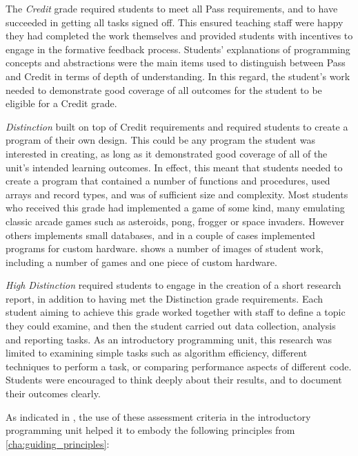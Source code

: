 The \emph{Credit} grade required students to meet all Pass requirements, and to have succeeded in getting all tasks signed off. This ensured teaching staff were happy they had completed the work themselves and provided students with incentives to engage in the formative feedback process. Students' explanations of programming concepts and abstractions were the main items used to distinguish between Pass and Credit in terms of depth of understanding. In this regard, the student's work needed to demonstrate good coverage of all outcomes for the student to be eligible for a Credit grade.

\emph{Distinction} built on top of Credit requirements and required students to create a program of their own design. This could be any program the student was interested in creating, as long as it demonstrated good coverage of all of the unit's intended learning outcomes. In effect, this meant that students needed to create a program that contained a number of functions and procedures, used arrays and record types, and was of sufficient size and complexity. Most students who received this grade had implemented a game of some kind, many emulating classic arcade games such as asteroids, pong, frogger or space invaders. However others implements small databases, and in a couple of cases implemented programs for custom hardware.  shows a number of images of student work, including a number of games and one piece of custom hardware.

\emph{High Distinction} required students to engage in the creation of a short research report, in addition to having met the Distinction grade requirements. Each student aiming to achieve this grade worked together with staff to define a topic they could examine, and then the student carried out data collection, analysis and reporting tasks. As an introductory programming unit, this research was limited to examining simple tasks such as algorithm efficiency, different techniques to perform a task, or comparing performance aspects of different code. Students were encouraged to think deeply about their results, and to document their outcomes clearly.

As indicated in , the use of these assessment criteria in the introductory programming unit helped it to embody the following principles from \cref{cha:guiding_principles}:

